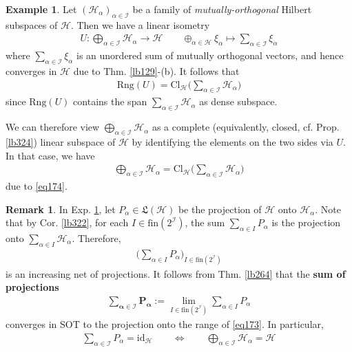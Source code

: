 \documentclass[12pt,b5paper,notitlepage]{article}
\theoremstyle{definition}
\newtheorem{eg}[df]{Example}
\newtheorem{rem}[df]{Remark}
\theoremstyle{plain}
\newcommand{\fk}{\mathfrak}
\newcommand{\id}{\mathrm{id}}
\newcommand{\Rng}{\mathrm{Rng}}
\newcommand{\fin}{\mathrm{fin}}
\newcommand{\Cl}{\mathrm{Cl}}
\newcommand{\MH}{\mathcal H}
\newcommand{\SI}{\mathscr I}
\newcommand{\hqed}{\hfill\qedsymbol}
\numberwithin{equation}{section}
\begin{document}
\begin{eg}\label{lb323}
Let $(\MH_\alpha)_{\alpha\in\SI}$ be a family of \textit{mutually-orthogonal} Hilbert subspaces of $\MH$. Then we have a linear isometry
\begin{align}\label{eq173}
U:\bigoplus_{\alpha\in\SI}\MH_\alpha\rightarrow\MH\qquad  \oplus_{\alpha\in\MH}\xi_\alpha\mapsto\sum_{\alpha\in\SI}\xi_\alpha
\end{align}
where $\sum_{\alpha\in\SI}\xi_\alpha$ is an unordered sum of mutually orthogonal vectors, and hence converges in $\MH$ due to Thm. \ref{lb129}-(b). It follows that 
\begin{align}\label{eq174}
\Rng(U)=\Cl_\MH\Big(\sum_{\alpha\in\SI}\MH_\alpha\Big)
\end{align}
since $\Rng(U)$ contains the span $\sum_{\alpha\in\SI}\MH_\alpha$ as dense subspace. 

We can therefore view $\bigoplus_{\alpha\in\SI}\MH_\alpha$ as a complete (equivalently, closed, cf. Prop. \ref{lb324}) linear subspace of $\MH$ by identifying the elements on the two sides via $U$. In that case, we have
\begin{align}\label{eq175}
\bigoplus_{\alpha\in\SI}\MH_\alpha=\Cl_\MH\Big(\sum_{\alpha\in\SI}\MH_\alpha\Big)
\end{align}
due to \eqref{eq174}.   \hqed
\end{eg}


\begin{rem}
In Exp. \ref{lb323}, let $P_\alpha\in\fk L(\MH)$ be the projection of $\MH$ onto $\MH_\alpha$. Note that by Cor. \ref{lb322}, for each $I\in\fin(2^\SI)$, the sum $\sum_{\alpha\in I}P_\alpha$ is the projection onto $\sum_{\alpha\in I}\MH_\alpha$. Therefore, 
\begin{align*}
\Big(\sum_{\alpha\in I}P_\alpha\Big)_{I\in\fin(2^\SI)}
\end{align*}
is an increasing net of projections. It follows from Thm. \ref{lb264} that the \textbf{sum of projections} 
\begin{gather*}
\pmb{\sum_{\alpha\in\SI}P_\alpha}:=\lim_{I\in\fin(2^\SI)}\sum_{\alpha\in I}P_\alpha
\end{gather*}
converges in SOT to the projection onto the range of \eqref{eq173}. In particular,
\begin{align*}
\sum_{\alpha\in\SI}P_\alpha=\id_\MH\qquad\Longleftrightarrow\qquad \bigoplus_{\alpha\in\SI}\MH_\alpha=\MH
\end{align*}
\end{rem}
\end{document}

